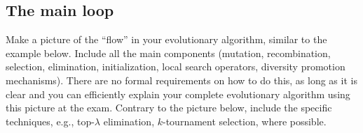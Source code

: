 \documentclass[a4paper,10pt]{article}
\newcommand{\ReplaceMe}[1]{{\color{blue}#1}}
\begin{document}
\subsection{The main loop}

\ReplaceMe{Make a picture of the ``flow'' in your evolutionary algorithm, similar to the example below. Include all the main components (mutation, recombination, selection, elimination, initialization, local search operators, diversity promotion mechanisms). There are no formal requirements on how to do this, as long as it is clear and you can efficiently explain your complete evolutionary algorithm using this picture at the exam. Contrary to the picture below, include the specific techniques, e.g., top-$\lambda$ elimination, $k$-tournament selection, where possible.
	
	

	
%				
%	
%
}
\end{document}
